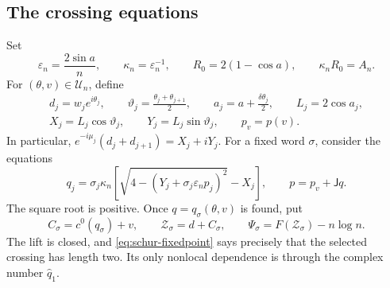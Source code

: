 \documentclass[11pt,reqno]{amsart}
\numberwithin{equation}{section}
\theoremstyle{definition}
\theoremstyle{remark}
\newcommand{\dd}{\delta}
\newcommand{\UU}{\mathscr U_n}
\begin{document}
\subsection{The crossing equations}
Set
\[
 \varepsilon_n=\frac{2\sin a}{n},\qquad
 \kappa_n=\varepsilon_n^{-1},\qquad
 R_0=2(1-\cos a),\qquad \kappa_nR_0=A_n.
\]
For $(\theta,v)\in\UU$, define
\begin{equation}\label{eq:fiber-geometry}
 \begin{gathered}
 d_j=w_je^{i\theta_j},\qquad
 \vartheta_j=\frac{\theta_j+\theta_{j+1}}2,\qquad
 a_j=a+\frac{\dd\theta_j}2,\qquad L_j=2\cos a_j,\\
 X_j=L_j\cos\vartheta_j,\qquad Y_j=L_j\sin\vartheta_j,
 \qquad p_v=p(v).
 \end{gathered}
\end{equation}
In particular, $e^{-i\mu_j}(d_j+d_{j+1})=X_j+iY_j$. For a fixed word $\sigma$, consider the equations
\begin{equation}\label{eq:schur-fixedpoint}
 q_j=\sigma_j\kappa_n
 \left[\sqrt{4-(Y_j+\sigma_j\varepsilon_np_j)^2}-X_j\right],
 \qquad p=p_v+\mathsf Jq.
\end{equation}
The square root is positive. Once $q=q_\sigma(\theta,v)$ is found, put
\begin{equation}\label{eq:schur-chart}
 C_\sigma=c^0(q_\sigma)+v,\qquad
 \mathcal Z_\sigma=d+C_\sigma,\qquad
 \Psi_\sigma=F(\mathcal Z_\sigma)-n\log n.
\end{equation}
The lift is closed, and \eqref{eq:schur-fixedpoint} says precisely that the selected crossing has length two. Its only nonlocal dependence is through the complex number $\widehat q_1$.
\end{document}
